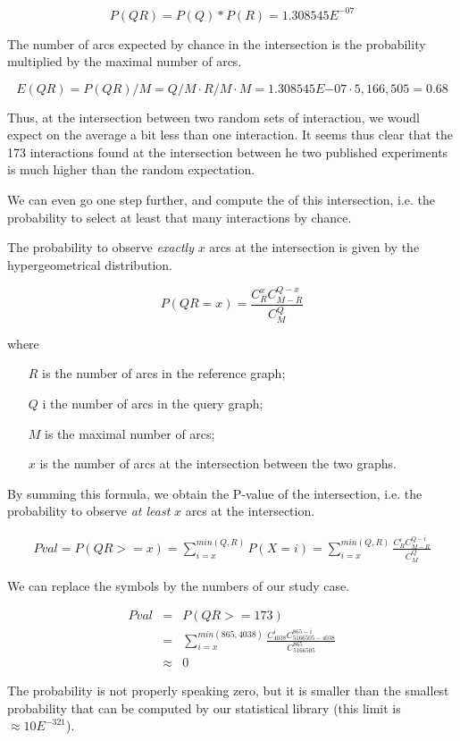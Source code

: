 \begin{enumerate}
\[P(QR) = P(Q)*P(R) = 1.308545E^{-07}\]

The number of arcs expected by chance in the intersection is the
probability multiplied by the maximal number of arcs.

\[E(QR) = P(QR)/M = Q/M \cdot R/M \cdot M = 1.308545E{-07} \cdot 5,166,505 = 0.68\]

Thus, at the intersection between two random sets of interaction, we
woudl expect on the average a bit less than one interaction. It seems
thus clear that the 173 interactions found at the intersection
between he two published experiments is much higher than the random
expectation.

We can even go one step further, and compute the 
of this intersection, i.e. the probability to select at least that
many interactions by chance. 

The probability to observe \textit{exactly} $x$ arcs at the
intersection is given by the hypergeometrical distribution.

\begin{equation}
\label{eq:hypergeometric_density}
P(QR=x)=\frac{C^{x}_{R}C^{Q-x}_{M-R}}{C^Q_{M}}
\end{equation}

where 
\begin{itemize}
\item[$R$] is the number of arcs in the reference graph;
\item[$Q$] i the number of arcs in the query graph;
\item[$M$] is the maximal number of arcs;
\item[$x$] is the number of arcs at the intersection between the two
  graphs.
\end{itemize}

By summing this formula, we obtain the P-value of the intersection,
i.e. the probability to observe \textit{at least} $x$ arcs at the
intersection.

\begin{eqnarray*}
\label{eq:hypergeometric_density_cdf}
Pval = P(QR>=x)=\sum_{i=x}^{min(Q,R)}P(X=i)=\sum_{i=x}^{min(Q,R)} \frac{C^i_{R}C^{Q-i}_{M-R}}{C^Q_{M}}
\end{eqnarray*}

We can replace the symbols by the numbers of our study case.

\begin{eqnarray*}
\label{eq:hypergeometric_density_cdf}
Pval & = & P(QR>=173) \\
 & = & \sum_{i=x}^{min(865,4038)} \frac{C^i_{4038}C^{865-i}_{5166505-4038}}{C^{865}_{5166505}}  \\
 & \approx & 0
\end{eqnarray*}

The probability is not properly speaking zero, but it is smaller than
the smallest probability that can be computed by our statistical
library (this limit is $\approx 10E^{-321}$).

\end{enumerate}

